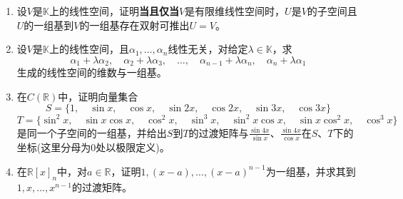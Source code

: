 \documentclass[a4paper,UTF8,fontset=windows,AutoFakeBold]{ctexart}
\begin{document}
\begin{enumerate}
    \item 设$V$是$\mathbb{K}$上的线性空间，证明\textbf{当且仅当}$V$是有限维线性空间时，$U$是$V$的子空间且$U$的一组基到$V$的一组基存在双射可推出$U=V$。
    
    \item 设$V$是$\mathbb{K}$上的线性空间，且$\alpha_1,\dots,\alpha_n$线性无关，对给定$\lambda\in\mathbb{K}$，求
    $$\alpha_1+\lambda\alpha_2,\quad\alpha_2+\lambda\alpha_3,\quad\dots,\quad\alpha_{n-1}+\lambda\alpha_n,\quad\alpha_n+\lambda\alpha_1$$
    生成的线性空间的维数与一组基。

    \item 在$C(\mathbb{R})$中，证明向量集合
    $$S=\{1,\quad\sin x,\quad\cos x,\quad\sin 2x,\quad\cos 2x,\quad\sin 3x,\quad\cos 3x\}$$
    $$T=\{\sin^2x,\quad\sin x\cos x,\quad\cos^2x,\quad\sin^3x,\quad\sin^2x\cos x,\quad\sin x\cos^2x,\quad\cos^3x\}$$
    是同一个子空间的一组基，并给出$S$到$T$的过渡矩阵与$\frac{\sin 4x}{\sin x}$、$\frac{\sin 4x}{\cos x}$在$S$、$T$下的坐标(这里分母为0处以极限定义)。

    \item 在$\mathbb{R}[x]_n$中，对$a\in\mathbb{R}$，证明$1,(x-a),\dots,(x-a)^{n-1}$为一组基，并求其到$1,x,\dots,x^{n-1}$的过渡矩阵。
\end{enumerate}
\end{document}
